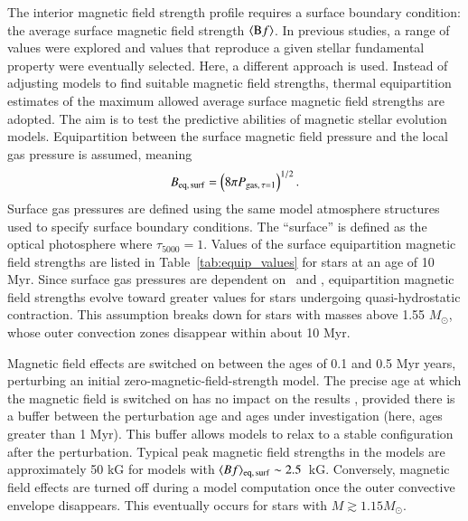 \documentclass{aa}
\begin{document}
The interior magnetic field strength profile requires a surface boundary condition: the average surface magnetic field strength $\langle{\rm B}f\rangle$. In previous studies, a range of values were explored and values that reproduce a given stellar fundamental property were eventually selected. Here, a different approach is used. Instead of adjusting models to find suitable magnetic field strengths, thermal equipartition estimates of the maximum allowed average surface magnetic field strengths are adopted. The aim is to test the predictive abilities of magnetic stellar evolution models. Equipartition between the surface magnetic field pressure and the local gas pressure is assumed, meaning
\begin{equation}
    B_{\rm eq,\, surf} = \left(8\pi P_{{\rm gas},\, \tau = 1}\right)^{1/2}.
\end{equation}
Surface gas pressures are defined using the same model atmosphere structures used to specify surface boundary conditions. The ``surface'' is defined as the optical photosphere where $\tau_{5000} = 1$. Values of the surface equipartition magnetic field strengths are listed in Table~\ref{tab:equip_values} for stars at an age of 10 Myr. Since surface gas pressures are dependent on \logg\ and \teff, equipartition magnetic field strengths evolve toward greater values for stars undergoing quasi-hydrostatic contraction. This assumption breaks down for stars with masses above 1.55 $M_{\odot}$, whose outer convection zones disappear within about 10 Myr.

Magnetic field effects are switched on between the ages of 0.1 and 0.5 Myr years, perturbing an initial zero-magnetic-field-strength model. The precise age at which the magnetic field is switched on has no impact on the results \citep{FC12b}, provided there is a buffer between the perturbation age and ages under investigation (here, ages greater than 1 Myr). This buffer allows models to relax to a stable configuration after the perturbation. Typical peak magnetic field strengths in the models are approximately 50 kG for models with $\langle Bf \rangle_{\rm eq,\,surf} \sim 2.5$~kG. Conversely, magnetic field effects are turned off during a model computation once the outer convective envelope disappears. This eventually occurs for stars with $M \gtrsim 1.15 M_{\odot}$.
\end{document}
